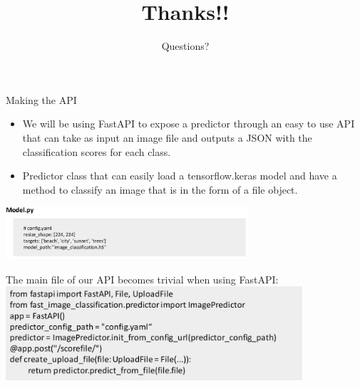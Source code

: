 \documentclass[aspectratio=169,12pt,usenames,dvipsnames]{beamer}
\begin{document}
\begin{frame}[t]{Making the API}
\begin{itemize}
\item We will be using FastAPI to expose a predictor through an easy to use API that can take as input an image file and outputs a JSON with the classification scores for each class.

\item Predictor class that can easily load a tensorflow.keras model and have a method to classify an image that is in the form of a file object.
\end{itemize}
\includegraphics[width=9cm]{FastAPI_Images/AIML_FastAPI_IMG5.png}
\end{frame}


\begin{frame}[t]{The main file of our API becomes trivial when using FastAPI:}
\includegraphics[width=11cm]{FastAPI_Images/AIML_FastAPI_IMG6.png}
\end{frame}

{ \1
\begin{frame}
	\title{Thanks!!}
	\subtitle{Questions?}
	\maketitle
\end{frame}
}
\end{document}

